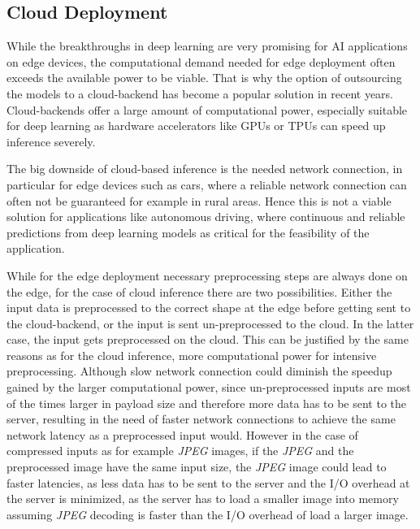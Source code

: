 \subsection{Cloud Deployment}
While the breakthroughs in deep learning are very promising for AI applications on edge devices, the computational demand needed for edge deployment often exceeds the available power to be viable.
That is why the option of outsourcing the models to a cloud-backend has become a popular solution in recent years.
Cloud-backends offer a large amount of computational power, especially suitable for deep learning  as hardware accelerators like GPUs or TPUs can speed up inference severely.

The big downside of cloud-based inference is the needed network connection, in particular for edge devices such as cars, where a reliable network connection can often not be guaranteed for example in rural areas. Hence this is not a viable solution for applications like autonomous driving, where continuous and reliable predictions from deep learning models as critical for the feasibility of the application.

While for the edge deployment necessary preprocessing steps are always done on the edge, for the case of cloud inference there are two possibilities. Either the input data is preprocessed to the correct shape at the edge before getting sent to the cloud-backend, or the input is sent un-preprocessed to the cloud. 
In the latter case, the input gets preprocessed on the cloud. 
This can be justified by the same reasons as for the cloud inference, more computational power for intensive preprocessing.
Although slow network connection could diminish the speedup gained by the larger computational power, since un-preprocessed inputs are most of the times larger in payload size and therefore more data has to be sent to the server, resulting in the need of faster network connections to achieve the same network latency as a preprocessed input would.
However in the case of compressed inputs as for example \emph{JPEG} images, if the \emph{JPEG} and the preprocessed image have the same input size, the \emph{JPEG} image could lead to faster latencies, as less data has to be sent to the server and the I/O overhead at the server is minimized, as the server has to load a smaller image into memory assuming \emph{JPEG} decoding is faster than the I/O overhead of load a larger image. 



